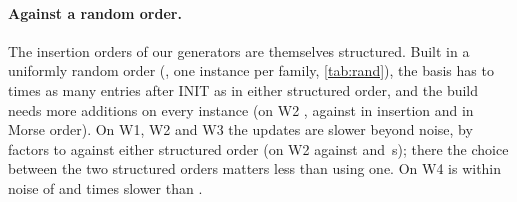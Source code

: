 \paragraph{Against a random order.} The insertion orders of our generators are
themselves structured. Built in a uniformly random order (, one
instance per family, \cref{tab:rand}), the basis has
\NumWFourPlaneNFourThousandDTwoNnzInitRandOverId{} to
\NumWThreeNFourteenNnzInitRandOverId{} times as many entries after INIT as in
either structured order, and the build needs more additions on every instance
(on W2 \NumWTwoNFifteenSEightDrbRandBuildAdds, against
\NumWTwoNFifteenSEightDrbIdBuildAdds{} in insertion and
\NumWTwoNFifteenSEightMmhmNorbBuildAdds{} in Morse order). On W1, W2 and W3 the
updates are slower beyond noise, by factors
\NumWThreeNFourteenDrbRandOverDrbIdAmort{} to
\NumWTwoNFifteenSEightDrbRandOverDrbIdAmort{} against either structured order
(on W2 \NumWTwoNFifteenSEightDrbRandAmort{} against
\NumWTwoNFifteenSEightDrbIdAmort{} and
\NumWTwoNFifteenSEightMmhmNorbAmort\,\textmu s); there the choice between the two
structured orders matters less than using one. On W4  is
within noise of  and
\NumWFourPlaneNFourThousandDTwoDrbRandOverMmhmNorbAmort{} times slower than
.

